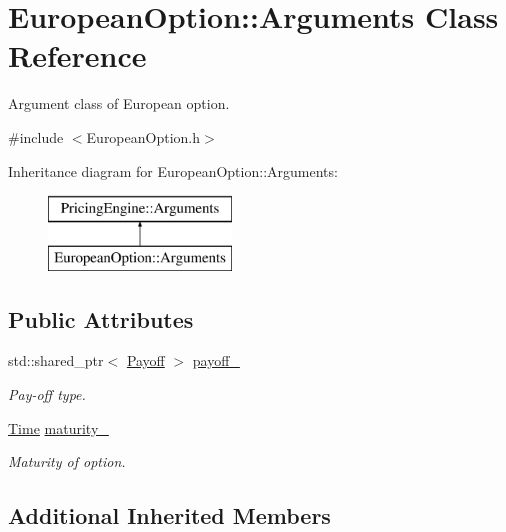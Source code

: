 \hypertarget{class_european_option_1_1_arguments}{}\section{European\+Option\+:\+:Arguments Class Reference}
\label{class_european_option_1_1_arguments}


Argument class of European option.  




{\ttfamily \#include $<$European\+Option.\+h$>$}

Inheritance diagram for European\+Option\+:\+:Arguments\+:\begin{figure}[H]
\begin{center}
\leavevmode
\includegraphics[height=2.000000cm]{class_european_option_1_1_arguments}
\end{center}
\end{figure}
\subsection*{Public Attributes}
\begin{DoxyCompactItemize}
\item 
std\+::shared\+\_\+ptr$<$ \hyperlink{class_payoff}{Payoff} $>$ \hyperlink{class_european_option_1_1_arguments_a01a26c6641a2bb9f439c4191c5eb7d76}{payoff\+\_\+}
\begin{DoxyCompactList}\small\item\em Pay-\/off type. \end{DoxyCompactList}\item 
\hyperlink{_name_def_8h_ac2d3e0ba793497bcca555c7c2cf64ff3}{Time} \hyperlink{class_european_option_1_1_arguments_a75cb97c8679f5827e3faa8db031e5196}{maturity\+\_\+}
\begin{DoxyCompactList}\small\item\em Maturity of option. \end{DoxyCompactList}\end{DoxyCompactItemize}
\subsection*{Additional Inherited Members}


